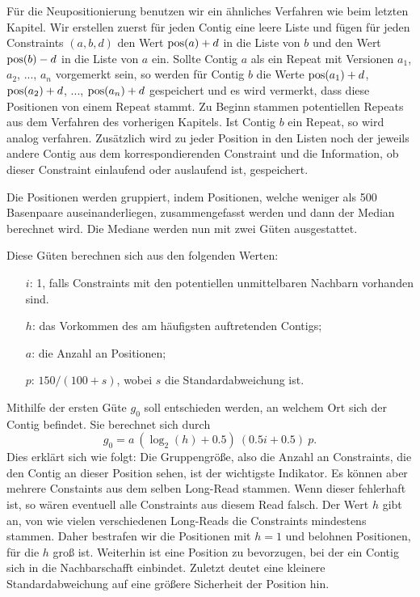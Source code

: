 Für die Neupositionierung benutzen wir ein ähnliches Verfahren wie beim letzten Kapitel. Wir erstellen zuerst für jeden Contig eine leere Liste
und fügen für jeden Constraints $(a,b,d)$ den Wert $\operatorname*{pos}(a)+d$ in die Liste von $b$ und den Wert $\operatorname*{pos}(b)-d$ in die Liste von $a$ ein. Sollte Contig $a$ als ein Repeat mit Versionen $a_1$, $a_2$, ..., $a_n$ vorgemerkt sein, so werden für Contig $b$ die Werte $\operatorname*{pos}(a_1)+d$, $\operatorname*{pos}(a_2)+d$, ..., $\operatorname*{pos}(a_n)+d$ gespeichert und es wird vermerkt, dass diese Positionen von einem Repeat stammt. 
Zu Beginn stammen potentiellen Repeats aus dem Verfahren des vorherigen Kapitels. 
Ist Contig $b$ ein Repeat, so wird analog verfahren.
Zusätzlich wird zu jeder Position in den Listen noch der jeweils andere Contig aus dem korrespondierenden Constraint und die Information, ob dieser Constraint einlaufend oder auslaufend ist, gespeichert.

Die Positionen werden gruppiert, indem Positionen, welche weniger als 500 Basenpaare auseinanderliegen, zusammengefasst werden und dann der Median berechnet wird. Die Mediane werden nun mit zwei Güten ausgestattet. 

Diese Güten berechnen sich aus den folgenden Werten:
\begin{itemize}
	\item[$i$:] 1, falls Constraints mit den potentiellen unmittelbaren Nachbarn vorhanden sind.\\
	\item[$h$:] das Vorkommen des am häufigsten auftretenden Contigs;
	\item[$a$:] die Anzahl an Positionen;
	\item[$p$:] $150 / (100+s)$, wobei $s$ die Standardabweichung ist.
\end{itemize}

Mithilfe der ersten Güte $g_0$ soll entschieden werden, an welchem Ort sich der Contig befindet. Sie berechnet sich durch 
\[  g_0 = a\ (\log_2(h) + 0.5) \ (0.5i + 0.5)\  p . \]
Dies erklärt sich wie folgt: Die Gruppengröße, also die Anzahl an Constraints, die den Contig an dieser Position sehen, ist der wichtigste Indikator. 
Es können aber mehrere Constaints aus dem selben Long-Read stammen. Wenn dieser fehlerhaft ist, so wären eventuell alle Constraints aus diesem Read falsch. Der Wert $h$ gibt an, von wie vielen verschiedenen Long-Reads die Constraints mindestens stammen. Daher bestrafen wir die Positionen mit $h=1$ und belohnen Positionen, für die $h$ groß ist. 
Weiterhin ist eine Position zu bevorzugen, bei der ein Contig sich in die Nachbarschafft einbindet. Zuletzt deutet eine kleinere Standardabweichung auf eine größere Sicherheit der Position hin. 

